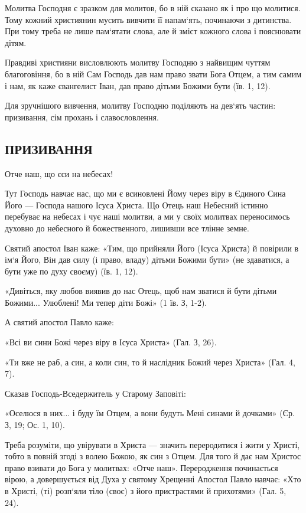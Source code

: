 \documentclass[main.tex]{subfiles}
\begin{document}
Молитва Господня є зразком для молитов, бо в ній сказано як і про що молитися. Тому кожний християнин мусить вивчити її напам`ять, починаючи з дитинства. При тому треба не лише пам`ятати слова, але й зміст кожного слова і пояснювати дітям.

Правдиві християни висловлюють молитву Господню з найвищим чуттям благоговіння, бо в ній Сам Господь дав нам право звати Бога Отцем, а тим самим і нам, як каже євангелист Іван, дав право дітьми Божими бути (їв. 1, 12).

Для зручнішого вивчення, молитву Господню поділяють на дев`ять частин: призивання, сім прохань і славословлення.
 
\subsection{ПРИЗИВАННЯ}

Отче наш, що єси на небесах!

Тут Господь навчає нас, що ми є всиновлені Йому через віру в Єдиного Сина Його — Господа нашого Ісуса Христа. Що Отець наш Небесний істинно перебуває на небесах і чує наші молитви, а ми у своїх молитвах переносимось духовно до небесного й божественного, лишивши все тлінне земне.

Святий апостол Іван каже: «Тим, що прийняли Його (Ісуса Христа) й повірили в ім`я Його, Він дав силу (і право, владу) дітьми Божими бути» (не здаватися, а бути уже по духу своєму) (їв. 1, 12).

«Дивіться, яку любов виявив до нас Отець, щоб нам зватися й бути дітьми Божими... Улюблені! Ми тепер діти Божі» (1 їв. З, 1-2).

А святий апостол Павло каже:

«Всі ви сини Божі через віру в Ісуса Христа» (Гал. З, 26).

«Ти вже не раб, а син, а коли син, то й наслідник Божий через Христа» (Гал. 4, 7).

Сказав Господь-Вседержитель у Старому Заповіті:

«Оселюся в них... і буду їм Отцем, а вони будуть Мені синами й дочками» (Єр. З, 19; Ос. 1, 10).

Треба розуміти, що увірувати в Христа — значить переродитися і жити у Христі, тобто в повній згоді з волею Божою, як син з Отцем. Для того й дає нам Христос право взивати до Бога у молитвах: «Отче наш». Переродження починається вірою, а довершується від Духа у святому Хрещенні Апостол Павло навчає: «Хто в Христі, (ті) розп`яли тіло (своє) з його пристрастями й прихотями» (Гал. 5, 24).
\end{document}
